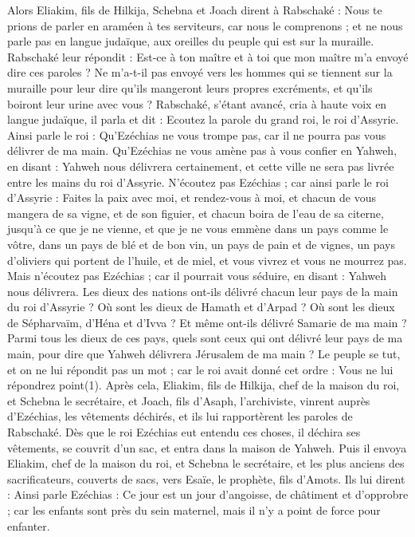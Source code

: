 \begin{multicols}{2}
Alors Eliakim, fils de Hilkija, Schebna et Joach dirent à Rabschaké : Nous te prions de parler en araméen à tes serviteurs, car nous le comprenons ; et ne nous parle pas en langue judaïque, aux oreilles du peuple qui est sur la muraille.
Rabschaké leur répondit : Est-ce à ton maître et à toi que mon maître m’a envoyé dire ces paroles ? Ne m’a-t-il pas envoyé vers les hommes qui se tiennent sur la muraille pour leur dire qu’ils mangeront leurs propres excréments, et qu’ils boiront leur urine avec vous ?
Rabschaké, s’étant avancé, cria à haute voix en langue judaïque, il parla et dit : Ecoutez la parole du grand roi, le roi d’Assyrie.
Ainsi parle le roi : Qu’Ezéchias ne vous trompe pas, car il ne pourra pas vous délivrer de ma main.
Qu’Ezéchias ne vous amène pas à vous confier en Yahweh, en disant : Yahweh nous délivrera certainement, et cette ville ne sera pas livrée entre les mains du roi d’Assyrie.
N’écoutez pas Ezéchias ; car ainsi parle le roi d’Assyrie : Faites la paix avec moi, et rendez-vous à moi, et chacun de vous mangera de sa vigne, et de son figuier, et chacun boira de l’eau de sa citerne,
jusqu’à ce que je ne vienne, et que je ne vous emmène dans un pays comme le vôtre, dans un pays de blé et de bon vin, un pays de pain et de vignes, un pays d’oliviers qui portent de l’huile, et de miel, et vous vivrez et vous ne mourrez pas. Mais n’écoutez pas Ezéchias ; car il pourrait vous séduire, en disant : Yahweh nous délivrera.
Les dieux des nations ont-ils délivré chacun leur pays de la main du roi d’Assyrie ?
Où sont les dieux de Hamath et d’Arpad ? Où sont les dieux de Sépharvaïm, d’Héna et d’Ivva ? Et même ont-ils délivré Samarie de ma main ?
Parmi tous les dieux de ces pays, quels sont ceux qui ont délivré leur pays de ma main, pour dire que Yahweh délivrera Jérusalem de ma main ?
Le peuple se tut, et on ne lui répondit pas un mot ; car le roi avait donné cet ordre : Vous ne lui répondrez point(1).
Après cela, Eliakim, fils de Hilkija, chef de la maison du roi, et Schebna le secrétaire, et Joach, fils d’Asaph, l’archiviste, vinrent auprès d’Ezéchias, les vêtements déchirés, et ils lui rapportèrent les paroles de Rabschaké.
\VerseOne{}Dès que le roi Ezéchias eut entendu ces choses, il déchira ses vêtements, se couvrit d’un sac, et entra dans la maison de Yahweh.
Puis il envoya Eliakim, chef de la maison du roi, et Schebna le secrétaire, et les plus anciens des sacrificateurs, couverts de sacs, vers Esaïe, le prophète, fils d’Amots.
Ils lui dirent : Ainsi parle Ezéchias : Ce jour est un jour d’angoisse, de châtiment et d’opprobre ; car les enfants sont près du sein maternel, mais il n’y a point de force pour enfanter.

\end{multicols}
